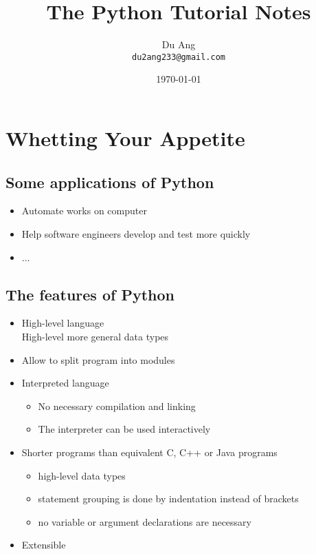 \documentclass[UTF8]{article}
\title{The Python Tutorial Notes}
\author{Du Ang \\ \texttt{du2ang233@gmail.com} }
\date{\today}
\begin{document}
\maketitle

\tableofcontents
\newpage

\section{Whetting Your Appetite}
\subsection{Some applications of Python}
\begin{itemize}
    \item Automate works on computer
    \item Help software engineers develop and test more quickly
    \item ...
\end{itemize}

\subsection{The features of Python}
\begin{itemize}
    \item High-level language \\
    High-level more general data types
    \item Allow to split program into modules
    \item Interpreted language
    \begin{itemize}
        \item No necessary compilation and linking
        \item The interpreter can be used interactively
    \end{itemize}
    \item Shorter programs than equivalent C, C++ or Java programs
    \begin{itemize}
        \item high-level data types
        \item statement grouping is done by indentation instead of brackets
        \item no variable or argument declarations are necessary
    \end{itemize}
    \item Extensible
\end{itemize}
\end{document}
